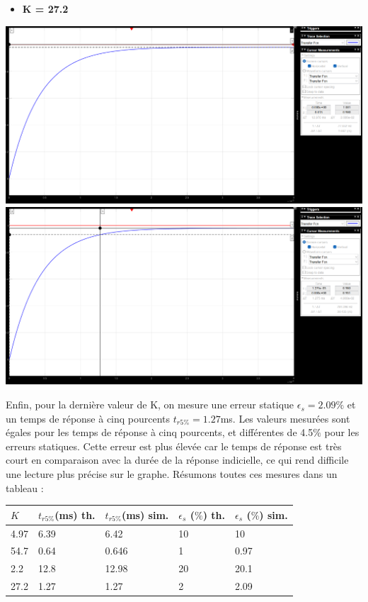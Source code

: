 \documentclass[12pt]{article}
\begin{document}
\begin{itemize}
    \item \bf \large K = 27.2
\end{itemize}
\begin{center}
    \includegraphics[width = 19 cm]{TP2 Simulink/Syst_1/err_stat_syst_1_K=27.2.png}
    \includegraphics[width = 19 cm]{TP2 Simulink/Syst_1/tr5prct_syst_1_K=27.2.png}
\end{center}
\normalsize Enfin, pour la dernière valeur de K, on mesure une erreur statique $\epsilon_s = 2.09\%$ et un temps de réponse à cinq pourcents $t_{r5\%} = 1.27$ms.
Les valeurs mesurées sont égales pour les temps de réponse à cinq pourcents, et différentes de 4.5$\%$ pour les erreurs statiques. Cette erreur est plus élevée car le temps de réponse est très court en comparaison avec la durée de la réponse indicielle, ce qui rend difficile une lecture plus précise sur le graphe.
\newpage
Résumons toutes ces mesures dans un tableau : 
\begin{center}
    \begin{tabular}{ |p{1cm}|p{2.5cm}|p{2.5cm}|p{2.5cm}|p{2.5cm}|}

        \hline
        $K$ & \normalsize  $t_{r5\%}$(ms) th. & $t_{r5\%}$(ms) sim. & $\epsilon_s$ ($\%$) th. & $\epsilon_s$ ($\%$) sim.\\
        \hline
        4.97 & 6.39 & 6.42 & 10 & 10\\
        54.7 & 0.64 & 0.646 & 1 & 0.97\\
        2.2& 12.8 & 12.98 & 20 & 20.1\\
        27.2 & 1.27 & 1.27 & 2 & 2.09\\
        
        
        \hline
        \end{tabular}
    \end{center}
\end{document}
